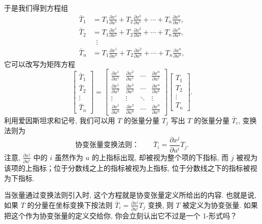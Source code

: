 于是我们得到方程组
\begin{align*}
\bar{T}_1&=T_1\frac{\partial x^1}{\partial u^1}+T_2\frac{\partial x^2}{\partial u^1}+\cdots+T_n\frac{\partial x^n}{\partial u^1},\\
\bar{T}_2&=T_1\frac{\partial x^1}{\partial u^2}+T_2\frac{\partial x^2}{\partial u^2}+\cdots+T_n\frac{\partial x^n}{\partial u^2},\\
&\;\;\vdots\\
\bar{T}_n&=T_1\frac{\partial x^1}{\partial u^n}+T_2\frac{\partial x^2}{\partial u^n}+\cdots+T_n\frac{\partial x^n}{\partial u^n},
\end{align*}
它可以改写为矩阵方程
\[
\begin{bmatrix}\bar{T}_1\\\bar{T}_2\\\vdots\\\bar{T}_n\end{bmatrix}
=
\begin{bmatrix}
\frac{\partial x^1}{\partial u^1}&\frac{\partial x^2}{\partial u^1}&\cdots&\frac{\partial x^n}{\partial u^1}\\
\frac{\partial x^1}{\partial u^2}&\frac{\partial x^2}{\partial u^2}&\cdots&\frac{\partial x^n}{\partial u^2}\\
\vdots&\vdots&\ddots&\vdots\\
\frac{\partial x^1}{\partial u^n}&\frac{\partial x^2}{\partial u^n}&\cdots&\frac{\partial x^n}{\partial u^n}
\end{bmatrix}
\begin{bmatrix}T_1\\T_2\\\vdots\\T_n\end{bmatrix}.
\]
利用爱因斯坦求和记号, 我们可以用 $T$ 的张量分量 $T_j$ 写出 $T$ 的张量分量 $\bar{T}_i$, 变换法则为
\[
\text{协变张量变换法则：}\qquad \bar{T}_i=\frac{\partial x^j}{\partial u^i}T_j.
\]
注意, $\frac{\partial x^j}{\partial u^i}$ 中的 $i$ 虽然作为 $u$ 的上指标出现, 却被视为整个项的下指标, 而 $j$ 被视为该项的上指标；位于分数线之上的指标被视为上指标, 位于分数线之下的指标被视为下指标.

当张量通过变换法则引入时, 这个方程就是协变张量定义所给出的内容. 也就是说, 如果 $T$ 的分量在坐标变换下按法则 $\bar{T}_i=\frac{\partial x^j}{\partial u^i}T_j$ 变换, 则 $T$ 被定义为协变张量. 如果把这个作为协变张量的定义交给你, 你会立刻认出它不过是一个 1-形式吗？

